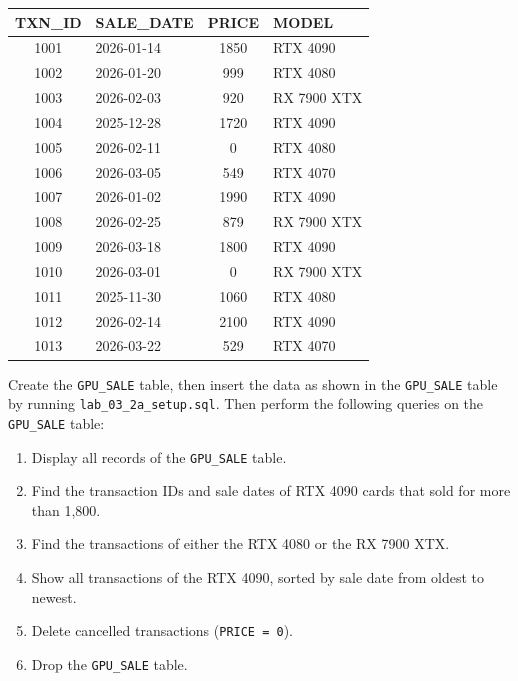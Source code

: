 \documentclass[12pt,a4paper]{article}
\begin{document}
    \begin{table}[h!]\centering
    \begin{tabular}{|c|l|c|l|}
        \hline
        \textbf{TXN\_ID} & \textbf{SALE\_DATE} & \textbf{PRICE} & \textbf{MODEL} \\ \hline
        1001 & 2026-01-14 & 1850 & RTX 4090 \\
        1002 & 2026-01-20 & 999 & RTX 4080 \\
        1003 & 2026-02-03 & 920 & RX 7900 XTX \\
        1004 & 2025-12-28 & 1720 & RTX 4090 \\
        1005 & 2026-02-11 & 0 & RTX 4080 \\
        1006 & 2026-03-05 & 549 & RTX 4070 \\
        1007 & 2026-01-02 & 1990 & RTX 4090 \\
        1008 & 2026-02-25 & 879 & RX 7900 XTX \\
        1009 & 2026-03-18 & 1800 & RTX 4090 \\
        1010 & 2026-03-01 & 0 & RX 7900 XTX \\
        1011 & 2025-11-30 & 1060 & RTX 4080 \\
        1012 & 2026-02-14 & 2100 & RTX 4090 \\
        1013 & 2026-03-22 & 529 & RTX 4070 \\ \hline
    \end{tabular}
    \end{table}

\noindent Create the \texttt{GPU\_SALE} table, then insert the data as shown in the \texttt{GPU\_SALE} table by running \texttt{lab\_03\_2a\_setup.sql}. Then perform the following queries on the \texttt{GPU\_SALE} table:
\begin{enumerate}
    \item Display all records of the \texttt{GPU\_SALE} table.
    \item Find the transaction IDs and sale dates of RTX 4090 cards that sold for more than 1,800.
    \item Find the transactions of either the RTX 4080 or the RX 7900 XTX.
    \item Show all transactions of the RTX 4090, sorted by sale date from oldest to newest.
    \item Delete cancelled transactions (\texttt{PRICE = 0}).
    \item Drop the \texttt{GPU\_SALE} table.

\end{enumerate}
\end{document}

